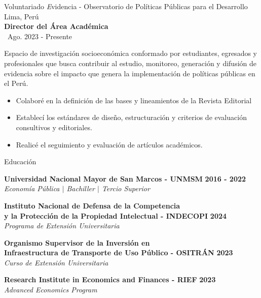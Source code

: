\documentclass{resume} %
\begin{document}
\begin{rSection}{Voluntariado}
{\textit Evidencia - Observatorio de Políticas Públicas para el Desarrollo \hfill Lima, Perú} \\
\textbf{Director del Área Académica} \\
\faCalendarCheck \, {Ago. 2023 - Presente}

Espacio de investigación socioeconómica conformado por estudiantes, egresados y profesionales que busca contribuir al estudio, monitoreo, generación y difusión de evidencia sobre el impacto que genera la implementación de políticas públicas en el Perú. \vspace{-5pt}
\begin{itemize}
    \item Colaboré en la definición de las bases y lineamientos de la Revista Editorial \vspace{-5pt}
    \item Establecí los estándares de diseño, estructuración y criterios de evaluación consultivos y editoriales. \vspace{-5pt}
    \item Realicé el seguimiento y evaluación de artículos académicos. \vspace{-5pt}
\end{itemize}
\end{rSection}


\begin{rSection}{Educación}

{\bf Universidad Nacional Mayor de San Marcos - UNMSM} \hfill {\bf 2016 - 2022} \\
{\it \small Economía Pública $|$  Bachiller $|$ Tercio Superior}

{\bf Instituto Nacional de Defensa de la Competencia \\ y la Protección de la Propiedad Intelectual -  INDECOPI} \hfill {\bf 2024} \\
{\it \small Programa de Extensión Universitaria}

{\bf Organismo Supervisor de la Inversión en \\ Infraestructura de Transporte de Uso Público - OSITRÁN} \hfill {\bf 2023} \\
{\it \small Curso de Extensión Universitaria}

{\bf Research Institute in Economics and Finances - RIEF} \hfill {\bf 2023} \\
{\it \small Advanced Economics Program}

\end{rSection}
\end{document}
